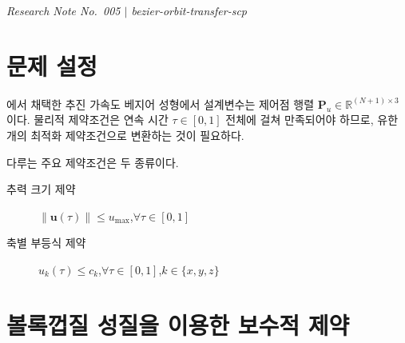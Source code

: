\documentclass[11pt]{article}
\begin{document}
\drawborder
\thispagestyle{firstpage}


{\normalsize\textit{Research Note No.~005 $|$ bezier-orbit-transfer-scp}}\par\medskip

\def\lighterdate{March 12, 2026}


\begin{abstract}
본 보고서는 베지어 곡선으로 성형된 추진 가속도에 부과되는 제약조건을
컨벡스 최적화 프레임워크 안에서 처리하는 방법을 정리한다.
볼록껍질 성질(convex hull property)을 이용한 보수적 제약 처리와,
극값 정리(extremum theorem)를 이용한 무손실 컨벡스화(lossless convexification)를
비교하여 제시한다.
또한 추력 크기 제약 $\|\mathbf{u}(\tau)\| \leq u_{\max}$를
2차 원뿔 계획법(SOCP) 제약으로 변환하는 절차를 유도한다.
\end{abstract}

\section{문제 설정}

\cite{report003}에서 채택한 추진 가속도 베지어 성형에서
설계변수는 제어점 행렬 $\mathbf{P}_u \in \mathbb{R}^{(N+1)\times 3}$이다.
물리적 제약조건은 연속 시간 $\tau \in [0,1]$ 전체에 걸쳐 만족되어야 하므로,
유한 개의 최적화 제약조건으로 변환하는 것이 필요하다.

다루는 주요 제약조건은 두 종류이다.

\begin{description}
  \item[추력 크기 제약] $\|\mathbf{u}(\tau)\| \leq u_{\max}$,\quad $\forall\tau\in[0,1]$
  \item[축별 부등식 제약] $u_k(\tau) \leq c_k$,\quad $\forall\tau\in[0,1]$,\quad $k \in \{x,y,z\}$
\end{description}

\section{볼록껍질 성질을 이용한 보수적 제약}
\end{document}
